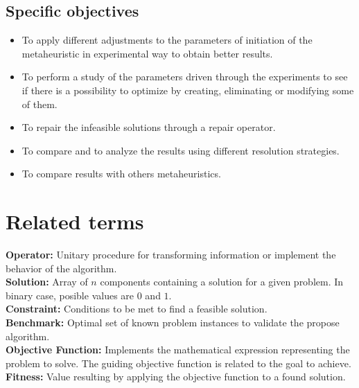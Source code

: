 \subsection{Specific objectives}
\begin{itemize}
\item To apply different adjustments to the parameters of initiation of the metaheuristic in experimental way to obtain better results.

\item To perform a study of the parameters driven through the experiments to see if there is a possibility to optimize by creating, eliminating or modifying some of them.

\item To repair the infeasible solutions through a repair operator.

\item To compare and to analyze the results using different resolution strategies.

\item To compare results with others metaheuristics.
\end{itemize}



\section{Related terms}

\textbf{Operator:} 
Unitary procedure for transforming information or implement the behavior of the algorithm.\\

\textbf{Solution:} 
Array of $n$ components containing a solution for a given problem. In binary case, posible values are $0$ and $1$.\\

\textbf{Constraint:} 
Conditions to be met to find a feasible solution.\\

\textbf{Benchmark:} 
Optimal set of known problem instances to validate the propose algorithm.\\

\textbf{Objective Function:}  
Implements the mathematical expression representing the problem to solve. The guiding objective function is related to the goal to achieve.\\

\textbf{Fitness:} 
Value resulting by applying the objective function to a found solution.\\

